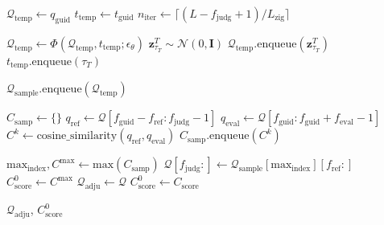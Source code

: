 \documentclass{article}
\theoremstyle{plain}
\theoremstyle{definition}
\theoremstyle{remark}
\begin{document}
\begin{algorithm}[htbp]
\begin{algorithmic}[1]
        \STATE $\mathcal{Q}_\mathrm{temp} \gets q_\mathrm{guid}$
        \STATE $t_\mathrm{temp} \gets t_\mathrm{guid}$
        \STATE $n_\mathrm{iter} \gets \lceil (L - f_\mathrm{judg} + 1) / L_{\mathrm{zig}} \rceil$
        
            \STATE $\mathcal{Q}_\mathrm{temp} \gets \Phi(\mathcal{Q}_\mathrm{temp}, t_\mathrm{temp}; \epsilon_\theta)$
                \STATE $\mathbf{z}_{\tau_T}^T \sim \mathcal{N}(0, \mathbf{I})$
                \STATE $\mathcal{Q}_\mathrm{temp}.\text{enqueue}(\mathbf{z}_{\tau_T}^T)$
                \STATE $t_\mathrm{temp}.\text{enqueue}(\tau_T)$
            \ENDFOR
        \ENDFOR
        
        \STATE $\mathcal{Q}_\mathrm{sample}.\text{enqueue}(\mathcal{Q}_\mathrm{temp})$
    \ENDFOR

    \STATE {\bfseries \textcolor{blue}{\# Determine whether correction is needed}}
    \STATE $C_\mathrm{samp} \gets \{\}$
        \STATE $q_\mathrm{ref} \gets \mathcal{Q}[f_\mathrm{guid} - f_\mathrm{ref}: f_\mathrm{judg} - 1]$
        \STATE $q_\mathrm{eval} \gets \mathcal{Q}[f_\mathrm{guid}: f_\mathrm{guid} + f_\mathrm{eval} - 1]$
        \STATE $C^k \gets \mathrm{cosine\_similarity}(q_\mathrm{ref}, q_\mathrm{eval})$
        \STATE $C_\mathrm{samp}.\text{enqueue}(C^k)$
    \ENDFOR

    \STATE $\mathrm{max_{index}}, C^\mathrm{max} \gets \text{max}(C_\mathrm{samp})$
        \STATE {\bfseries \textcolor{blue}{\# Perform correction.}}
        \STATE $\mathcal{Q}[f_\mathrm{judg}:] \gets \mathcal{Q}_\mathrm{sample}[\mathrm{max_{index}}][f_\mathrm{ref}:]$
        \STATE $C^0_\mathrm{score} \gets C^\mathrm{max}$
    \ELSE
        \STATE {\bfseries \textcolor{blue}{\# Do not perform correction.}}
        \STATE $\mathcal{Q}_\mathrm{adju} \gets \mathcal{Q}$
        \STATE $C^0_\mathrm{score} \gets C_\mathrm{score}$
    \ENDIF
\ENDIF

 $\mathcal{Q}_\mathrm{adju}$, \quad $C^0_\mathrm{score}$

\end{algorithmic}
\end{algorithm}
\end{document}
